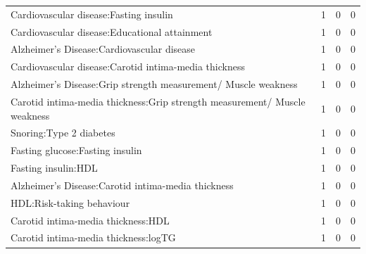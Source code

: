 \begin{table}[ht]
\begin{tabular}{lrrr}
  Cardiovascular disease:Fasting insulin &   1 &   0 &   0 \\ 
  Cardiovascular disease:Educational attainment &   1 &   0 &   0 \\ 
  Alzheimer's Disease:Cardiovascular disease &   1 &   0 &   0 \\ 
  Cardiovascular disease:Carotid intima-media thickness &   1 &   0 &   0 \\ 
  Alzheimer's Disease:Grip strength measurement/ Muscle weakness &   1 &   0 &   0 \\ 
  Carotid intima-media thickness:Grip strength measurement/ Muscle weakness &   1 &   0 &   0 \\ 
  Snoring:Type 2 diabetes &   1 &   0 &   0 \\ 
  Fasting glucose:Fasting insulin &   1 &   0 &   0 \\ 
  Fasting insulin:HDL &   1 &   0 &   0 \\ 
  Alzheimer's Disease:Carotid intima-media thickness &   1 &   0 &   0 \\ 
  HDL:Risk-taking behaviour &   1 &   0 &   0 \\ 
  Carotid intima-media thickness:HDL &   1 &   0 &   0 \\ 
  Carotid intima-media thickness:logTG &   1 &   0 &   0 \\ 
   \hline
\end{tabular}
\end{table}

